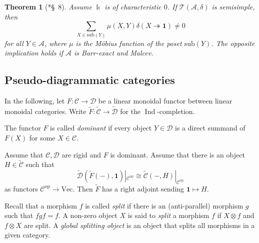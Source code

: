\documentclass[11pt]{amsart}
\newtheorem{theorem}{Theorem}[section]
\theoremstyle{definition}
\theoremstyle{remark}
\newcommand\cA{\mathcal A}
\newcommand\cC{\mathcal C}
\newcommand\cD{\mathcal D}
\newcommand\cT{\mathcal T}
\newcommand\kk{\Bbbk}
\newcommand\Ind{\operatorname{Ind}}
\renewcommand\:\colon
\renewcommand\o\otimes
\newcommand\one{\mathbf{1}}
\renewcommand\Vec{\mathrm{Vec}}
\renewcommand\o\otimes
\renewcommand\:\colon
\newcommand\op{^{\mathrm{op}}}
\newcommand\subobj{\mathrm{sub}}
\newcommand\tto{\twoheadrightarrow}
\begin{document}
\begin{theorem}[\cite{knop}*{\S~8}] \label{thm:knop} Assume $\kk$ is of characteristic $0$. If $\cT(\cA,\delta)$ is semisimple, then
    \[
        \sum_{X \in \subobj(Y)} \mu(X, Y) \delta(X \tto \one) \ne 0
    \]
    for all $Y \in \cA$, where $\mu$ is the Möbius function of the poset $\subobj(Y)$. The opposite implication holds if $\cA$ is Barr-exact and Malcev.
\end{theorem}

\subsection{Pseudo-diagrammatic categories} \label{ss:pseudo-diagrammatic-categories}

In the following, let $F: \cC \to \cD$ be a linear monoidal functor between linear monoidal categories. Write $\tilde{F}: \tilde{\cC} \to \tilde{\cD}$ for the $\Ind$-completion.

\begin{definition}
    The functor $F$ is called \emph{dominant} if every object $Y \in \cD$ is a direct summand of $F(X)$ for some $X \in \cC$.
\end{definition}

\begin{lemma} \label{l:ind-adjoint}
    Assume that $\cC, \cD$ are rigid and $F$ is dominant. Assume that there is an object $H \in \tilde{\cC}$ such that
    \[
        \tilde{\cD}(\tilde{F}(-), \one)|_{\cC\op} \cong \tilde{\cC}(-, H)|_{\cC\op}
    \]
    as functors $\cC\op \to \Vec$. Then $\tilde{F}$ has a right adjoint sending $\one \mapsto H$.
\end{lemma}

Recall that a morphism $f$ is called \emph{split} if there is an (anti-parallel) morphism $g$ such that $fgf=f$. A non-zero object $X$ is said to \emph{split} a morphism $f$ if $X\o f$ and $f\o X $ are split. A \emph{global splitting object} is an object that splits all morphisms in a given category.
\end{document}
